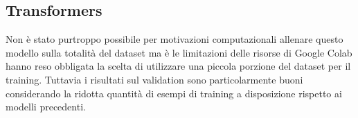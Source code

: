 \subsection{Transformers}

Non è stato purtroppo possibile per motivazioni computazionali allenare questo
modello sulla totalità del dataset ma è le limitazioni delle risorse di Google
Colab hanno reso obbligata la scelta di utilizzare una piccola porzione del
dataset per il training. Tuttavia i risultati sul validation sono
particolarmente buoni considerando la ridotta quantità di esempi di training a
disposizione rispetto ai modelli precedenti.